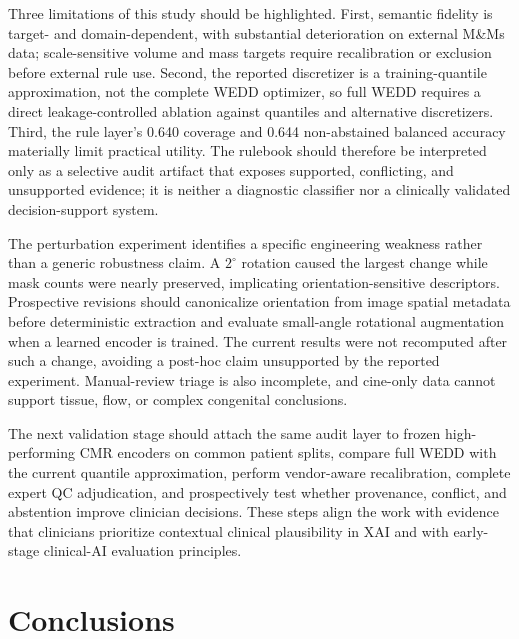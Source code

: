 \documentclass{ceurart}
\begin{document}
Three limitations of this study should be highlighted. First, semantic fidelity is target- and domain-dependent, with substantial deterioration on external M\&Ms data; scale-sensitive volume and mass targets require recalibration or exclusion before external rule use. Second, the reported discretizer is a training-quantile approximation, not the complete WEDD optimizer, so full WEDD requires a direct leakage-controlled ablation against quantiles and alternative discretizers. Third, the rule layer's 0.640 coverage and 0.644 non-abstained balanced accuracy materially limit practical utility. The rulebook should therefore be interpreted only as a selective audit artifact that exposes supported, conflicting, and unsupported evidence; it is neither a diagnostic classifier nor a clinically validated decision-support system.

The perturbation experiment identifies a specific engineering weakness rather than a generic robustness claim. A \(2^\circ\) rotation caused the largest change while mask counts were nearly preserved, implicating orientation-sensitive descriptors. Prospective revisions should canonicalize orientation from image spatial metadata before deterministic extraction and evaluate small-angle rotational augmentation when a learned encoder is trained. The current results were not recomputed after such a change, avoiding a post-hoc claim unsupported by the reported experiment. Manual-review triage is also incomplete, and cine-only data cannot support tissue, flow, or complex congenital conclusions.

The next validation stage should attach the same audit layer to frozen high-performing CMR encoders on common patient splits, compare full WEDD with the current quantile approximation, perform vendor-aware recalibration, complete expert QC adjudication, and prospectively test whether provenance, conflict, and abstention improve clinician decisions. These steps align the work with evidence that clinicians prioritize contextual clinical plausibility in XAI and with early-stage clinical-AI evaluation principles.

\section{Conclusions}\label{sec:conclusions}
\end{document}
